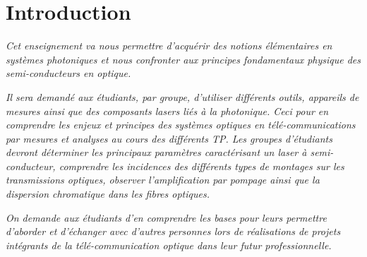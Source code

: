 \section*{Introduction}
\label{Introduction}
\textit{Cet enseignement va nous permettre d'acquérir des notions élémentaires en systèmes photoniques et nous confronter aux principes fondamentaux physique des semi-conducteurs en optique.}

\textit{Il sera demandé aux étudiants, par groupe, d'utiliser différents outils, appareils de mesures ainsi que des composants lasers liés à la photonique. Ceci pour en comprendre les enjeux et principes des systèmes optiques en télé-communications par mesures et analyses au cours des différents TP. Les groupes d'étudiants devront déterminer les principaux paramètres caractérisant un laser à semi-conducteur, comprendre les incidences des différents types de montages sur les transmissions optiques, observer l'amplification par pompage ainsi que la dispersion chromatique dans les fibres optiques.}

\textit{On demande aux étudiants d'en comprendre les bases pour leurs permettre d'aborder et d'échanger avec d'autres personnes lors de réalisations de projets intégrants de la télé-communication optique dans leur futur professionnelle.}
